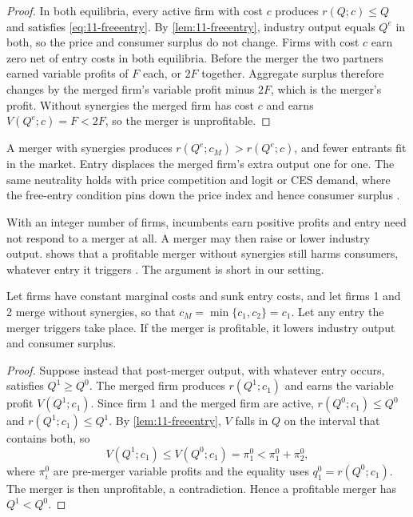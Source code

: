 \begin{proof}
In both equilibria, every active firm with cost $c$ produces $r(Q; c) \le Q$ and satisfies \eqref{eq:11-freeentry}.
By \cref{lem:11-freeentry},
industry output equals $Q^e$ in both, so the price and consumer surplus do not change. Firms with cost $c$ earn zero
net of entry costs in both equilibria. Before the merger the two partners earned variable profits of $F$ each, or
$2F$ together. Aggregate surplus therefore changes by the merged firm's variable profit minus $2F$, which is the
merger's profit. Without synergies the merged firm has cost $c$ and earns $V(Q^e; c) = F < 2F$, so the merger is
unprofitable.
\end{proof}

A merger with synergies produces $r(Q^e; c_M) > r(Q^e; c)$, and fewer entrants fit in the market. Entry displaces
the merged firm's extra output one for one. The same neutrality holds with price competition and logit or CES
demand, where the free-entry condition pins down the price index and hence consumer surplus
\citep{AndersonErkalPiccinin2020}.

With an integer number of firms, incumbents earn positive profits and entry need not respond to a merger at all. A
merger may then raise or lower industry output. \citet{Spector2003} shows that a profitable merger without synergies
still harms consumers, whatever entry it triggers \citep[p.~232]{AskerNocke2021}. The argument is short in our
setting.

\begin{proposition}\label{prop:11-spector}
Let firms have constant marginal costs and sunk entry costs, and let firms 1 and 2 merge without synergies, so that
$c_M = \min\{c_1, c_2\} = c_1$. Let any entry the merger triggers take place. If the merger is profitable, it lowers
industry output and consumer surplus.
\end{proposition}

\begin{proof}
Suppose instead that post-merger output, with whatever entry occurs, satisfies $Q^1 \ge Q^0$. The merged firm
produces $r(Q^1; c_1)$ and earns the variable profit $V(Q^1; c_1)$. Since firm 1 and the merged firm are active,
$r(Q^0; c_1) \le Q^0$ and $r(Q^1; c_1) \le Q^1$. By \cref{lem:11-freeentry}, $V$ falls in $Q$ on the interval that
contains both, so
\begin{equation*}
V(Q^1; c_1) \le V(Q^0; c_1) = \pi_1^0 < \pi_1^0 + \pi_2^0 ,
\end{equation*}
where $\pi_i^0$ are pre-merger variable profits and the equality uses $q_1^0 = r(Q^0; c_1)$. The merger is then
unprofitable, a contradiction. Hence a profitable merger has $Q^1 < Q^0$.
\end{proof}

